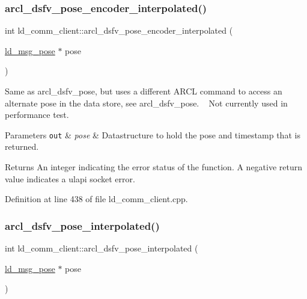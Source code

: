 \mbox{\label{classld__comm__client_a0b983bc131cfc619e8ab8785daef32e8}} 
\subsubsection{\texorpdfstring{arcl\+\_\+dsfv\+\_\+pose\+\_\+encoder\+\_\+interpolated()}{arcl\_dsfv\_pose\_encoder\_interpolated()}}
{\footnotesize\ttfamily int ld\+\_\+comm\+\_\+client\+::arcl\+\_\+dsfv\+\_\+pose\+\_\+encoder\+\_\+interpolated (\begin{DoxyParamCaption}\item[{\mbox{\hyperlink{structld__msg__pose}{ld\+\_\+msg\+\_\+pose}} $\ast$}]{pose }\end{DoxyParamCaption})}

Same as arcl\+\_\+dsfv\+\_\+pose, but uses a different A\+R\+CL command to access an alternate pose in the data store, see arcl\+\_\+dsfv\+\_\+pose. ~\newline
Not currently used in performance test. 
\begin{DoxyParams}[1]{Parameters}
\mbox{\tt out}  & {\em pose} & Datastructure to hold the pose and timestamp that is returned. \\
\hline
\end{DoxyParams}
\begin{DoxyReturn}{Returns}
An integer indicating the error status of the function. A negative return value indicates a ulapi socket error. 
\end{DoxyReturn}


Definition at line 438 of file ld\+\_\+comm\+\_\+client.\+cpp.

\mbox{\label{classld__comm__client_a1cbdd2fcd2ea8d7d4072c3953ce5f11d}} 
\subsubsection{\texorpdfstring{arcl\+\_\+dsfv\+\_\+pose\+\_\+interpolated()}{arcl\_dsfv\_pose\_interpolated()}}
{\footnotesize\ttfamily int ld\+\_\+comm\+\_\+client\+::arcl\+\_\+dsfv\+\_\+pose\+\_\+interpolated (\begin{DoxyParamCaption}\item[{\mbox{\hyperlink{structld__msg__pose}{ld\+\_\+msg\+\_\+pose}} $\ast$}]{pose }\end{DoxyParamCaption})}

